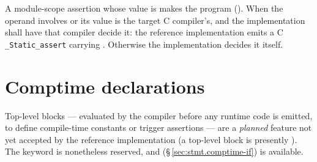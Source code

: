 \begin{constraint}
  A module-scope assertion whose value is  makes the program \illformed{}
  ().  When the operand involves  or  its value is
  the target C compiler's, and the implementation shall have that compiler decide it: the
  reference implementation emits a C \texttt{\_Static\_assert} carrying .
  Otherwise the implementation decides it itself.
\end{constraint}

\section{Comptime declarations}
\label{sec:decl.comptime}

\begin{note}
  Top-level  blocks --- evaluated by the compiler
  before any runtime code is emitted, to define compile-time constants or
  trigger  assertions --- are a \emph{planned} feature not
  yet accepted by the reference implementation (a top-level 
  block is presently ).  The  keyword is
  nonetheless reserved, and  (\S\,\ref{sec:stmt.comptime-if})
  is available.
\end{note}

